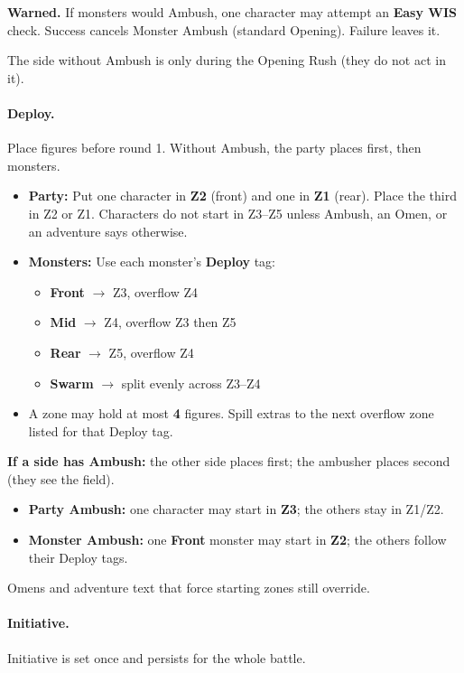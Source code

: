 \textbf{Warned.} If monsters would Ambush, one character may attempt an \textbf{Easy WIS} check. Success cancels Monster Ambush (standard Opening). Failure leaves it.

The side without Ambush is  only during the Opening Rush (they do not act in it).

\paragraph{Deploy.}
Place figures before round 1. Without Ambush, the party places first, then monsters.

\begin{itemize}
    \item \textbf{Party:} Put one character in \textbf{Z2} (front) and one in \textbf{Z1} (rear). Place the third in Z2 or Z1. Characters do not start in Z3--Z5 unless Ambush, an Omen, or an adventure says otherwise.
    \item \textbf{Monsters:} Use each monster's \textbf{Deploy} tag:
    \begin{itemize}
        \item \textbf{Front} $\rightarrow$ Z3, overflow Z4
        \item \textbf{Mid} $\rightarrow$ Z4, overflow Z3 then Z5
        \item \textbf{Rear} $\rightarrow$ Z5, overflow Z4
        \item \textbf{Swarm} $\rightarrow$ split evenly across Z3--Z4
    \end{itemize}
    \item A zone may hold at most \textbf{4} figures. Spill extras to the next overflow zone listed for that Deploy tag.
\end{itemize}

\textbf{If a side has Ambush:} the other side places first; the ambusher places second (they see the field).
\begin{itemize}
    \item \textbf{Party Ambush:} one character may start in \textbf{Z3}; the others stay in Z1/Z2.
    \item \textbf{Monster Ambush:} one \textbf{Front} monster may start in \textbf{Z2}; the others follow their Deploy tags.
\end{itemize}
Omens and adventure text that force starting zones still override.

\paragraph{Initiative.}
Initiative is set once and persists for the whole battle.

